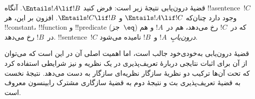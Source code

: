 \documentclass[../../../include/open-logic-section]{subfiles}
\begin{document}


قضیهٔ درون‌یابی نتیجهٔ زیر است: فرض کنید $\Entails !A \lif !B$.
آنگاه !!a{sentence}~$!C$ وجود دارد چنان‌که
$\Entails !A \lif !C$ و $\Entails !C \lif !B$. افزون بر این، هر
!!{constant}، !!{function} و !!{predicate} (جز~$\eq$) که در~$!C$ رخ
می‌دهد، هم در~$!A$ و هم در~$!B$ رخ می‌دهد. !!{sentence}~$!C$
\emph{درون‌یابِ}~$!A$ و~$!B$ نامیده می‌شود.

قضیهٔ درون‌یابی به‌خودی‌خود جالب است، اما اهمیت اصلی آن در این است که
می‌توان از آن برای اثبات نتایجی دربارهٔ تعریف‌پذیری در یک نظریه و نیز
شرایطی استفاده کرد که تحت آن‌ها ترکیب دو نظریهٔ سازگار نظریه‌ای سازگار
به دست می‌دهد. نتیجهٔ نخست به قضیهٔ تعریف‌پذیری بث و نتیجهٔ دوم به
قضیهٔ سازگاری مشترک رابینسون معروف است.
\end{document}
